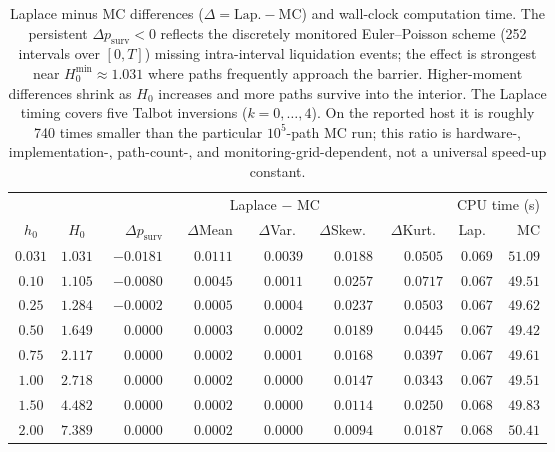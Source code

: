 \begin{table}[ht]
\centering\small
\renewcommand{\arraystretch}{1.3}
\begin{tabular}{cc rrrrr rr}
\toprule
& & \multicolumn{5}{c}{Laplace $-$ MC} & \multicolumn{2}{c}{CPU time (s)} \\
\cmidrule(lr){3-7}\cmidrule(lr){8-9}
$h_0$ & $H_0$ & $\Delta p_{\mathrm{surv}}$ & $\Delta$Mean & $\Delta$Var.\ & $\Delta$Skew.\ & $\Delta$Kurt.\ & Lap.\ & MC \\
\midrule
$0.031$ & $1.031$ & $-0.0181$ & $\phantom{-}0.0111$ & $\phantom{-}0.0039$ & $\phantom{-}0.0188$ & $\phantom{-}0.0505$ & $0.069$ & $51.09$ \\
$0.10$ & $1.105$ & $-0.0080$ & $\phantom{-}0.0045$ & $\phantom{-}0.0011$ & $\phantom{-}0.0257$ & $\phantom{-}0.0717$ & $0.067$ & $49.51$ \\
$0.25$ & $1.284$ & $-0.0002$ & $\phantom{-}0.0005$ & $\phantom{-}0.0004$ & $\phantom{-}0.0237$ & $\phantom{-}0.0503$ & $0.067$ & $49.62$ \\
$0.50$ & $1.649$ & $\phantom{-}0.0000$ & $\phantom{-}0.0003$ & $\phantom{-}0.0002$ & $\phantom{-}0.0189$ & $\phantom{-}0.0445$ & $0.067$ & $49.42$ \\
$0.75$ & $2.117$ & $\phantom{-}0.0000$ & $\phantom{-}0.0002$ & $\phantom{-}0.0001$ & $\phantom{-}0.0168$ & $\phantom{-}0.0397$ & $0.067$ & $49.61$ \\
$1.00$ & $2.718$ & $\phantom{-}0.0000$ & $\phantom{-}0.0002$ & $\phantom{-}0.0000$ & $\phantom{-}0.0147$ & $\phantom{-}0.0343$ & $0.067$ & $49.51$ \\
$1.50$ & $4.482$ & $\phantom{-}0.0000$ & $\phantom{-}0.0002$ & $\phantom{-}0.0000$ & $\phantom{-}0.0114$ & $\phantom{-}0.0250$ & $0.068$ & $49.83$ \\
$2.00$ & $7.389$ & $\phantom{-}0.0000$ & $\phantom{-}0.0002$ & $\phantom{-}0.0000$ & $\phantom{-}0.0094$ & $\phantom{-}0.0187$ & $0.068$ & $50.41$ \\
\bottomrule
\end{tabular}
\caption{Laplace minus MC differences ($\Delta = \text{Lap.} - \text{MC}$) and wall-clock
computation time. The persistent $\Delta p_{\mathrm{surv}}<0$ reflects the discretely
monitored Euler--Poisson scheme (252 intervals over $[0,T]$) missing intra-interval
liquidation events; the
effect is strongest near $H_0^{\min}\approx1.031$ where paths frequently approach the barrier.
Higher-moment differences shrink as $H_0$ increases and more paths survive into the interior.
The Laplace timing covers five Talbot inversions ($k=0,\ldots,4$). On the reported host it
is roughly 740 times smaller than the particular $10^5$-path MC run; this ratio is
hardware-, implementation-, path-count-, and monitoring-grid-dependent, not a universal
speed-up constant.}
\label{tab:diff}
\end{table}

